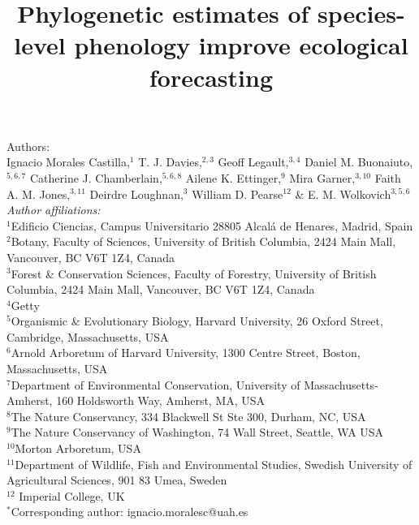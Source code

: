 \documentclass[11pt]{article}
\title{Phylogenetic estimates of species-level phenology improve ecological forecasting}
\def\labelitemi{--}
\begin{document}



\maketitle

\noindent Authors:\\
Ignacio Morales Castilla,$^{1}$ T. J. Davies,$^{2,3}$ Geoff Legault,$^{3,4}$ Daniel M. Buonaiuto,$^{5,6,7}$ Catherine J. Chamberlain,$^{5,6,8}$ Ailene K. Ettinger,$^{9}$ Mira Garner,$^{3,10}$ Faith A. M. Jones,$^{3,11}$ Deirdre Loughnan,$^{3}$ William D. Pearse$^{12}$ \& E. M. Wolkovich$^{3,5,6}$  \vspace{2ex}\\
\emph{Author affiliations:}\\
$^{1}$Edificio Ciencias, Campus Universitario 28805 Alcal\'a de Henares, Madrid, Spain\\
 $^{2}$Botany, Faculty of Sciences, University of British Columbia, 2424 Main Mall, Vancouver, BC V6T 1Z4, Canada\\
$^{3}$Forest \& Conservation Sciences, Faculty of Forestry, University of British Columbia, 2424 Main Mall, Vancouver, BC V6T 1Z4, Canada\\
$^{4}$Getty\\
$^{5}$Organismic \& Evolutionary Biology, Harvard University, 26 Oxford Street, Cambridge, Massachusetts, USA\\
$^{6}$Arnold Arboretum of Harvard University, 1300 Centre Street, Boston, Massachusetts, USA\\
$^{7}$Department of Environmental Conservation, University of Massachusetts-Amherst, 160 Holdsworth Way, Amherst, MA, USA\\  %
 $^{8}$The Nature Conservancy, 334 Blackwell St Ste 300, Durham, NC, USA \\ %
$^{9}$The Nature Conservancy of Washington, 74 Wall Street, Seattle, WA  USA \\ %
$^{10}$Morton Arboretum, USA  \\ 
$^{11}$Department of Wildlife, Fish and Environmental Studies, Swedish University of Agricultural Sciences, 901 83 Umea, Sweden\\ %
$^{12}$ Imperial College, UK\\

\vspace{2ex}
$^*$Corresponding author: ignacio.moralesc@uah.es\\
\renewcommand{\thetable}{\arabic{table}}
\renewcommand{\thefigure}{\arabic{figure}}
\renewcommand{\labelitemi}{$-$}
\end{document}

